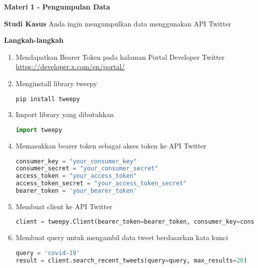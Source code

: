 \documentclass{article}
\begin{document}
    \begin{flushleft}
        \textbf{Materi 1 \@- Pengumpulan Data}
        \newline

        \textbf{Studi Kasus}
        \newline
        Anda ingin mengumpulkan data menggunakan API Twitter
        \newline

        \textbf{Langkah-langkah}

        \begin{enumerate}
            \item Mendapatkan Bearer Token pada halaman Portal Developer Twitter \href{https://developer.x.com/en/portal/}{https://developer.x.com/en/portal/}
            \item Menginstall library tweepy
            \lstset{style=bashstyle}
            \begin{lstlisting}[language=bash]
pip install tweepy
            \end{lstlisting}

            \item Import library yang dibutuhkan
            \lstset{style=pythonstyle}
            \begin{lstlisting}[language=python]
import tweepy
            \end{lstlisting}

            \item Memasukkan bearer token sebagai akses token ke API Twitter
            \lstset{style=pythonstyle}
            \begin{lstlisting}[language=python]
consumer_key = "your_consumer_key"
consumer_secret = "your_consumer_secret"
access_token = "your_access_token"
access_token_secret = "your_access_token_secret"
bearer_token = 'your_bearer_token'
            \end{lstlisting}

            \item Membuat client ke API Twitter
            \lstset{style=pythonstyle}
            \begin{lstlisting}[language=python]
client = tweepy.Client(bearer_token=bearer_token, consumer_key=consumer_key, consumer_secret=consumer_secret, access_token=access_token, access_token_secret=access_token_secret)            \end{lstlisting}

            \item Membuat query untuk mengambil data tweet berdasarkan kata kunci
            \lstset{style=pythonstyle}
            \begin{lstlisting}[language=python]
query = 'covid-19'
result = client.search_recent_tweets(query=query, max_results=20)
            \end{lstlisting}
        \end{enumerate}
    \end{flushleft}
\end{document}
